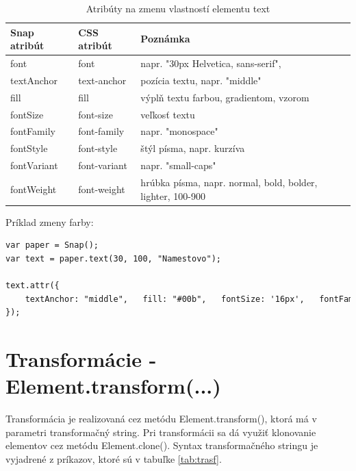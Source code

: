 \begin{table}[H]
	\begin{center}
		\begin{tabular}{|l|l|p{8cm}|}
			\hline \textbf{Snap atribút}  &\textbf{ CSS atribút}  & \textbf{Poznámka} \\ 
						\hline
			\hline font & font & napr. "30px Helvetica, sans-serif",\\ 
			\hline textAnchor & text-anchor & pozícia textu, napr. "middle" \\ 
			\hline fill & fill & výplň textu farbou, gradientom, vzorom \\ 
			\hline fontSize  & font-size  & veľkosť textu  \\ 
			\hline fontFamily & font-family & napr. "monospace" \\ 
			\hline fontStyle & font-style  & štýl písma, napr. kurzíva  \\ 
			\hline fontVariant  & font-variant  & napr. "small-caps"  \\ 
			\hline fontWeight & font-weight  &  hrúbka písma,  napr. normal, bold, bolder, lighter, 100-900\\ 
			\hline 
		\end{tabular} 
	\end{center}
\label{tab:text}
\caption{Atribúty na zmenu vlastností elementu text}
\end{table}

Príklad zmeny farby: 
\begin{lstlisting}[language = html]
var paper = Snap();
var text = paper.text(30, 100, "Namestovo");

text.attr({
	textAnchor: "middle", 	fill: "#00b", 	fontSize: '16px', 	fontFamily: "Veranda", 	fontStyle: "italic", 	fontVariant: "small-caps", 	fontWeight: 800, 
});
\end{lstlisting}

\section{Transformácie - Element.transform(...)}

Transformácia je realizovaná cez metódu Element.transform(), ktorá má v parametri transformačný string. Pri transformácii sa dá využiť klonovanie elementov cez metódu Element.clone(). Syntax transformačného stringu je vyjadrené z príkazov, ktoré sú v tabuľke \ref{tab:trasf}. 

